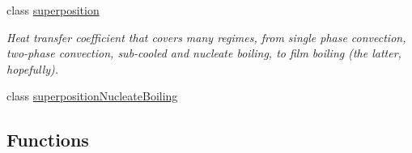 \begin{DoxyCompactItemize}
class \hyperlink{classFoam_1_1FSHeatTransferCoefficientModels_1_1superposition}{superposition}
\begin{DoxyCompactList}\small\item\em Heat transfer coefficient that covers many regimes, from single phase convection, two-\/phase convection, sub-\/cooled and nucleate boiling, to film boiling (the latter, hopefully). \end{DoxyCompactList}\item 
class \hyperlink{classFoam_1_1FSHeatTransferCoefficientModels_1_1superpositionNucleateBoiling}{superposition\+Nucleate\+Boiling}
\end{DoxyCompactItemize}
\subsection*{Functions}
